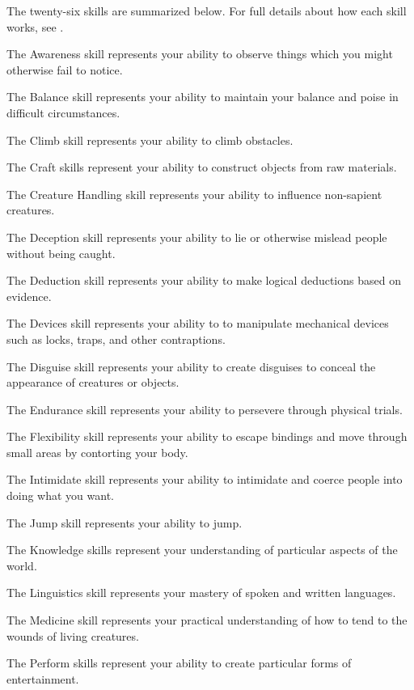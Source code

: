     The twenty-six skills are summarized below.
    For full details about how each skill works, see .

    \begin{raggeditemize}
        \item The Awareness skill represents your ability to observe things which you might otherwise fail to notice.
        \item The Balance skill represents your ability to maintain your balance and poise in difficult circumstances.
        \item The Climb skill represents your ability to climb obstacles.
        \item The Craft skills represent your ability to construct objects from raw materials.
        \item The Creature Handling skill represents your ability to influence non-sapient creatures.
        \item The Deception skill represents your ability to lie or otherwise mislead people without being caught.
        \item The Deduction skill represents your ability to make logical deductions based on evidence.
        \item The Devices skill represents your ability to to manipulate mechanical devices such as locks, traps, and other contraptions.
        \item The Disguise skill represents your ability to create disguises to conceal the appearance of creatures or objects.
        \item The Endurance skill represents your ability to persevere through physical trials.
        \item The Flexibility skill represents your ability to escape bindings and move through small areas by contorting your body.
        \item The Intimidate skill represents your ability to intimidate and coerce people into doing what you want.
        \item The Jump skill represents your ability to jump.
        \item The Knowledge skills represent your understanding of particular aspects of the world.
        \item The Linguistics skill represents your mastery of spoken and written languages.
        \item The Medicine skill represents your practical understanding of how to tend to the wounds of living creatures.
        \item The Perform skills represent your ability to create particular forms of entertainment.

\end{raggeditemize}
